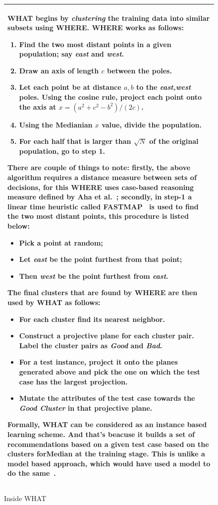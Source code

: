 \documentclass[conference]{IEEEtran}
\begin{document}
\begin{figure}[htbp!]
\small
\begin{tabular}{|p{.95\linewidth}|}\hline
WHAT begins by \textit{clustering} the training data into similar subsets using WHERE. WHERE works as follows:
\begin{enumerate}
\item Find the two most distant points in a given population; say {\em east} and {\em west}. 
\item Draw an axis of length $c$ between the poles. 
\item Let each point be at distance $a,b$ to the {\em east,west} poles.  Using the cosine rule, project each point onto the  axis  at $x=(a^2 + c^2 - b^2)/(2c)$.  
\item Using the Medianian $x$ value, divide the population.
\item For each half that is larger than $\sqrt{N}$ of the original population, go to step 1.
\end{enumerate}

There are couple of things to note: firstly, the above algorithm requires a distance measure between sets of decisions, for this WHERE uses case-based reasoning measure defined by Aha et al.~\cite{aha91}; secondly, in step-1 a linear time heuristic called FASTMAP~\cite{fastmap} is used to find the two most distant points, this procedure is listed below:
\begin{itemize}
\item Pick a point at random; 
\item Let {\em east} be the point furthest from that point; 
\item Then {\em west} be the point furthest from {\em east}.
\end{itemize}

The final clusters that are found by WHERE are then used by WHAT as follows:
\begin{itemize}
\item For each cluster find its nearest neighbor.
\item Construct a projective plane for each cluster pair. Label the cluster pairs as {\em Good} and {\em Bad}.
\item For a test instance, project it onto the planes generated above and pick the one on which the test case has the largest projection.
\item Mutate the attributes of the test case towards the {\em Good Cluster} in that projective plane. 
\end{itemize}

Formally, WHAT can be considered as an instance based  learning scheme. And that's beacuse it builds a set of recommendations based on a given test case based on the clusters forMedian at the training stage. This is unlike a model based approach, which would have used a model to do the same~\cite{xomo}.
\\\hline
\end{tabular}
\caption{Inside WHAT}\label{fig:what}
\end{figure}
\end{document}

